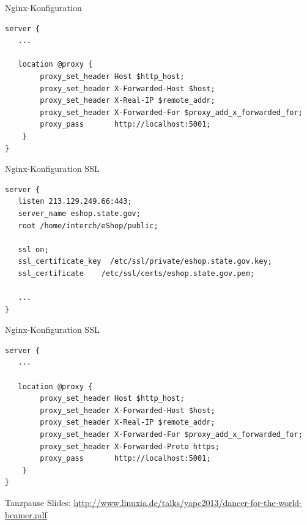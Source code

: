 \begin{frame}[fragile]{Nginx-Konfiguration}
\begin{lstlisting}
server {
   ...

   location @proxy {
        proxy_set_header Host $http_host;
        proxy_set_header X-Forwarded-Host $host;
        proxy_set_header X-Real-IP $remote_addr;
        proxy_set_header X-Forwarded-For $proxy_add_x_forwarded_for;
        proxy_pass       http://localhost:5001;
    }
}
\end{lstlisting}
\end{frame}

\begin{frame}[fragile]{Nginx-Konfiguration SSL}
\begin{lstlisting}
server {
   listen 213.129.249.66:443;
   server_name eshop.state.gov;
   root /home/interch/eShop/public;

   ssl on;
   ssl_certificate_key  /etc/ssl/private/eshop.state.gov.key;
   ssl_certificate    /etc/ssl/certs/eshop.state.gov.pem;

   ...
}
\end{lstlisting}
\end{frame}

\begin{frame}[fragile]{Nginx-Konfiguration SSL}
\begin{lstlisting}
server {
   ...

   location @proxy {
        proxy_set_header Host $http_host;
        proxy_set_header X-Forwarded-Host $host;
        proxy_set_header X-Real-IP $remote_addr;
        proxy_set_header X-Forwarded-For $proxy_add_x_forwarded_for;
        proxy_set_header X-Forwarded-Proto https;
        proxy_pass       http://localhost:5001;
    }
}
\end{lstlisting}
\end{frame}

\begin{frame}{Tanzpause}
Slides:
\url{http://www.linuxia.de/talks/yapc2013/dancer-for-the-world-beamer.pdf}
\end{frame}



